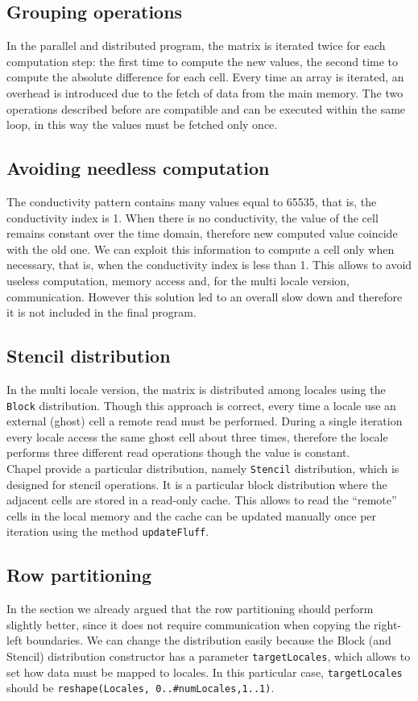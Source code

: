 \documentclass{article}
\begin{document}
\subsection{Grouping operations}
In the parallel and distributed program, the matrix is iterated twice for each computation step: the first time to compute the new values, the second time to compute the absolute difference for each cell. Every time an array is iterated, an overhead is introduced due to the fetch of data from the main memory. The two operations described before are compatible and can be executed within the same loop, in this way the values must be fetched only once.

\subsection{Avoiding needless computation}
The conductivity pattern contains many values equal to 65535, that is, the conductivity index is 1. When there is no conductivity, the value of the cell remains constant over the time domain, therefore new computed value coincide with the old one. We can exploit this information to compute a cell only when necessary, that is, when the conductivity index is less than 1. This allows to avoid useless computation, memory access and, for the multi locale version, communication. However this solution led to an overall slow down and therefore it is not included in the final program.

\subsection{Stencil distribution}
In the multi locale version, the matrix is distributed among locales using the \texttt{Block} distribution. Though this approach is correct, every time a locale use an external (ghost) cell a remote read must be performed. During a single iteration every locale access the same ghost cell about three times, therefore the locale performs three different read operations though the value is constant. \\
Chapel provide a particular distribution, namely \texttt{Stencil} distribution, which is designed for stencil operations. It is a particular block distribution where the adjacent cells are stored in a read-only cache. This allows to read the “remote” cells in the local memory and the cache can be updated manually once per iteration using the method \texttt{updateFluff}.

\subsection{Row partitioning}
In the section  we already argued that the row partitioning should perform slightly better, since it does not require communication when copying the right-left boundaries. We can change the distribution easily because the Block (and Stencil) distribution constructor has a parameter \texttt{targetLocales}, which allows to set how data must be mapped to locales. In this particular case, \texttt{targetLocales} should be \texttt{reshape(Locales, {0..\#numLocales,1..1})}.
\end{document}
